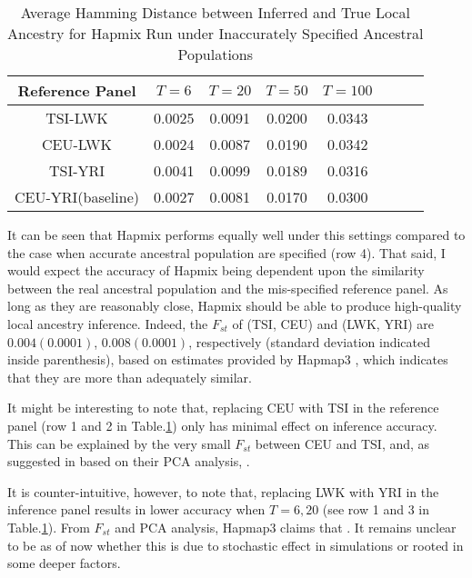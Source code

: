\documentclass{article}
\begin{document}
\begin{table}[H]
\begin{center}
\begin{tabular}{  c| c c c c c c c}
Reference Panel &$T=6$ & $T=20$ & $T=50$ & $T=100$ & \\
\hline
TSI-LWK & 0.0025 & 0.0091 & 0.0200 & 0.0343 & \\
CEU-LWK & 0.0024 & 0.0087 & 0.0190 & 0.0342 & \\
TSI-YRI & 0.0041 & 0.0099 & 0.0189 & 0.0316 & \\
CEU-YRI(baseline)& 0.0027 & 0.0081 & 0.0170 & 0.0300
\end{tabular}
\end{center}
\caption{Average Hamming Distance between Inferred and True Local Ancestry for Hapmix Run under Inaccurately Specified Ancestral Populations}
\label{tab:misRef}
\end{table}

It can be seen that Hapmix performs equally well under this settings compared to the case when accurate ancestral population are specified (row 4). That said, I would expect the accuracy of Hapmix being dependent upon the similarity between the real ancestral population and the mis-specified reference panel. As long as they are reasonably close, Hapmix should be able to produce high-quality local ancestry inference. Indeed, the $F_{st}$ of (TSI, CEU) and (LWK, YRI) are $0.004(0.0001)$, $0.008(0.0001)$, respectively (standard deviation indicated inside parenthesis), based on estimates provided by Hapmap3 \cite{hapmap3}, which indicates that they are more than adequately similar.

It might be interesting to note that, replacing CEU with TSI in the reference panel (row 1 and 2 in Table.\ref{tab:misRef}) only has minimal effect on inference accuracy. This can be explained by the very small $F_{st}$ between CEU and TSI, and, as suggested in \cite{hapmap3} based on their PCA analysis, . 

It is counter-intuitive, however, to note that, replacing LWK with YRI in the inference panel results in lower accuracy when $T=6,20$ (see row 1 and 3 in Table.\ref{tab:misRef}). From $F_{st}$ and PCA analysis, Hapmap3 claims that  \cite{hapmap3}. It remains unclear to be as of now whether this is due to stochastic effect in simulations or rooted in some deeper factors. 
\end{document}
